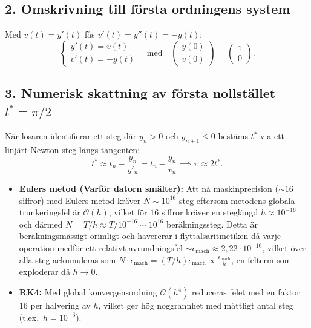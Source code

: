 \documentclass{article}
\begin{document}
\subsection*{2. Omskrivning till första ordningens system}
Med $v(t) = y'(t)$ fås $v'(t) = y''(t) = -y(t)$:
\begin{equation}
    \begin{cases}
        y'(t) = v(t) \\
        v'(t) = -y(t)
    \end{cases}
    \quad \text{med} \quad
    \begin{pmatrix} y(0) \\ v(0) \end{pmatrix} = \begin{pmatrix} 1 \\ 0 \end{pmatrix}.
\end{equation}

\subsection*{3. Numerisk skattning av första nollstället $t^* = \pi/2$}
När lösaren identifierar ett steg där $y_n > 0$ och $y_{n+1} \le 0$ bestäms $t^*$ via ett linjärt Newton-steg längs tangenten:
\begin{equation}
    t^* \approx t_n - \frac{y_n}{y'_n} = t_n - \frac{y_n}{v_n} \implies \pi \approx 2t^*.
\end{equation}

\begin{itemize}
    \item \textbf{Eulers metod (Varför datorn smälter):}
    Att nå maskinprecision ($\sim 16$ siffror) med Eulers metod kräver $N \sim 10^{16}$ steg eftersom metodens globala trunkeringsfel är $\mathcal{O}(h)$, vilket för $16$ siffror kräver en steglängd $h \approx 10^{-16}$ och därmed $N = T/h \approx T/10^{-16} \sim 10^{16}$ beräkningssteg. Detta är beräkningsmässigt orimligt och havererar i flyttalsaritmetiken då varje operation medför ett relativt avrundningsfel $\sim \epsilon_{\text{mach}} \approx 2{,}22 \cdot 10^{-16}$, vilket över alla steg ackumuleras som $N \cdot \epsilon_{\text{mach}} = (T/h)\epsilon_{\text{mach}} \propto \frac{\epsilon_{\text{mach}}}{h}$, en felterm som exploderar då $h \to 0$.
    
    \item \textbf{RK4:}
    Med global konvergensordning $\mathcal{O}(h^4)$ reduceras felet med en faktor $16$ per halvering av $h$, vilket ger hög noggrannhet med måttligt antal steg (t.ex.\ $h = 10^{-3}$).
\end{itemize}
\end{document}
